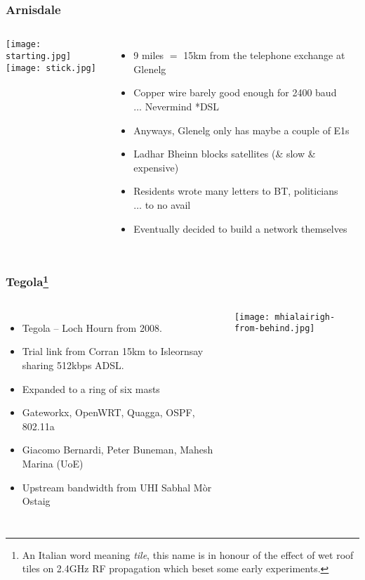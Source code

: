 \documentclass{beamer}
\begin{document}
\begin{frame}
  \frametitle{Arnisdale}
  \begin{columns}
    \begin{center}
      \vspace{-2\baselineskip}
      \texttt{[image: starting.jpg]}\\
      \texttt{[image: stick.jpg]}
    \end{center}
    \begin{itemize}%
      \item 9 miles $=$ 15km from the telephone exchange at Glenelg
      \item Copper wire barely good enough for 2400 baud\\
        $\ldots$ Nevermind *DSL
      \item Anyways, Glenelg only has maybe a couple of E1s
      \item Ladhar Bheinn blocks satellites (\& slow \& expensive)
      \item Residents wrote many letters to BT, politicians\\
        $\ldots$ to no avail
      \item Eventually decided to build a network themselves
    \end{itemize}
  \end{columns}
\end{frame}
\begin{frame}
  \frametitle{Tegola\footnote{An Italian word meaning \textit{tile},
      this name is in honour of the effect of wet roof tiles on 2.4GHz
      RF propagation which beset some early experiments.}}
  \begin{columns}
    \begin{itemize}
      \item Tegola -- Loch Hourn from 2008.
      \item Trial link from Corran 15km to Isleornsay sharing
        512kbps ADSL.
      \item Expanded to a ring of six masts
      \item Gateworkx, OpenWRT, Quagga, OSPF, 802.11a
      \item Giacomo Bernardi, Peter Buneman, Mahesh Marina (UoE)
      \item Upstream bandwidth from UHI Sabhal M\`{o}r Ostaig
    \end{itemize}
    \hspace{-2em}
    \texttt{[image: mhialairigh-from-behind.jpg]}
  \end{columns}
\end{frame}
\end{document}

